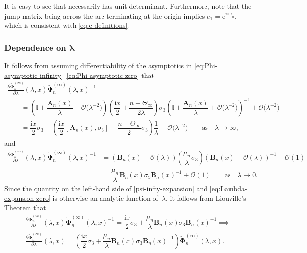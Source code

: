 \documentclass[pdftex]{sigma}
\numberwithin{equation}{section}
\newcommand{\ee}{\mathrm{e}}
\newcommand{\ii}{\mathrm{i}}
\newcommand{\para}[1]{\breve{#1}}
\begin{document}
It is easy to see that \smash{$\para{\mathbf{\Phi}}_n^{(\infty)}(\lambda,x)$} necessarily has unit determinant. Furthermore, note that the jump matrix being  across the arc terminating at the origin implies
$e_1 = \ee^{\pi \ii \mu_n}$, which is consistent with \eqref{eq:e-definitions}.

\subsubsection[Dependence on lambda]{Dependence on $\boldsymbol{\lambda}$}
It follows from assuming differentiability of the asymptotics in \eqref{eq:Phi-asymptotic-infinity}--\eqref{eq:Phi-asymptotic-zero} that
\begin{gather}
 \frac{\partial\para{\boldsymbol \Phi}_{n}^{(\infty)}}{\partial\lambda}(\lambda,x) \para{\boldsymbol \Phi}^{(\infty)}_n(\lambda,x)^{-1}\nonumber\\
\qquad= \left(\mathbb I + \dfrac{\mathbf{A}_{n}(x)}{\lambda} + \mathcal{O}\big( \lambda^{-2}\big) \right)\left( \dfrac{\ii x}{2} + \dfrac{n - \Theta_\infty}{2 \lambda} \right) \sigma_3 \left(\mathbb I + \dfrac{\mathbf{A}_{n}(x)}{\lambda} + \mathcal{O}\big( \lambda^{-2}\big) \right)^{-1} + \mathcal{O}\big(\lambda^{-2}\big)\nonumber\\
 \qquad= \dfrac{\ii x}{2} \sigma_3 + \left( \dfrac{\ii x}{2} [\mathbf{A}_{n}(x), \sigma_3] + \dfrac{n - \Theta_\infty}{2} \sigma_3 \right) \dfrac{1}{\lambda} + \mathcal{O}\big( \lambda^{-2} \big) \qquad \text{as} \quad \lambda \to \infty,
\label{psi-infty-expansion}
\end{gather}
and
\begin{align}
 \frac{\partial\para{\boldsymbol \Phi}_{n}^{(\infty)}}{\partial\lambda}(\lambda,x)\para{\boldsymbol \Phi}^{(\infty)}_n(\lambda,x)^{-1} &= \left( \mathbf{B}_{n}(x) + \mathcal{O}(\lambda) \right) \left( \dfrac{\mu_n}{\lambda} \sigma_3 \right) \left( \mathbf{B}_{n}(x) + \mathcal{O}(\lambda) \right)^{-1} + \mathcal{O}(1)
 \nonumber\\
 &= \dfrac{\mu_n}{\lambda} \mathbf{B}_{n}(x) \sigma_3 \mathbf{B}_{n}(x)^{-1} + \mathcal{O}(1) \qquad \text{as} \quad \lambda \to 0.
\label{eq:Lambda-expansion-zero}
\end{align}
Since the quantity on the left-hand side of \eqref{psi-infty-expansion} and \eqref{eq:Lambda-expansion-zero} is otherwise an analytic function of~$\lambda$, it follows from Liouville's Theorem that
\begin{gather}
 \frac{\partial\para{\boldsymbol \Phi}_{n}^{(\infty)}}{\partial\lambda}(\lambda,x) \para{\boldsymbol \Phi}_n^{(\infty)}(\lambda,x)^{-1} = \dfrac{\ii x}{2} \sigma_3 + \dfrac{\mu_n}{\lambda} \mathbf{B}_{n}(x) \sigma_3 \mathbf{B}_{n}(x)^{-1} \implies\nonumber\\ \frac{\partial\para{\boldsymbol \Phi}_{n}^{(\infty)}}{\partial\lambda}(\lambda,x)= \left( \dfrac{\ii x}{2} \sigma_3 + \dfrac{\mu_n}{\lambda} \mathbf{B}_{n}(x) \sigma_3 \mathbf{B}_{n}(x)^{-1} \right) \para{\boldsymbol \Phi}_n^{(\infty)} (\lambda,x).
 \label{Lax-system-lambda}
\end{gather}
\end{document}
